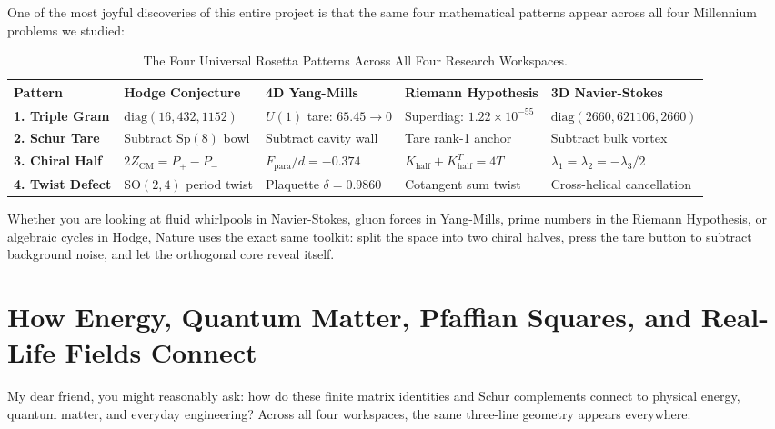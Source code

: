 \documentclass[11pt,a4paper]{article}
\theoremstyle{definition}
\begin{document}
One of the most joyful discoveries of this entire project is that the same four mathematical patterns appear across all four Millennium problems we studied:

\begin{table}[htbp]
\centering
\small
\begin{tabular}{lllll}
\toprule
\textbf{Pattern} & \textbf{Hodge Conjecture} & \textbf{4D Yang-Mills} & \textbf{Riemann Hypothesis} & \textbf{3D Navier-Stokes} \\
\midrule
\textbf{1. Triple Gram} & $\mathrm{diag}(16, 432, 1152)$ & $U(1)$ tare: $65.45 \to 0$ & Superdiag: $1.22 \times 10^{-55}$ & $\mathrm{diag}(2660, 621106, 2660)$ \\
\textbf{2. Schur Tare} & Subtract $\mathrm{Sp}(8)$ bowl & Subtract cavity wall & Tare rank-1 anchor & Subtract bulk vortex \\
\textbf{3. Chiral Half} & $2 Z_{\mathrm{CM}} = P_+ - P_-$ & $F_{\mathrm{para}} / d = -0.374$ & $K_{\mathrm{half}} + K_{\mathrm{half}}^T = 4 T$ & $\lambda_1 = \lambda_2 = -\lambda_3 / 2$ \\
\textbf{4. Twist Defect} & $\mathrm{SO}(2,4)$ period twist & Plaquette $\delta = 0.9860$ & Cotangent sum twist & Cross-helical cancellation \\
\bottomrule
\end{tabular}
\caption{The Four Universal Rosetta Patterns Across All Four Research Workspaces.}
\end{table}

Whether you are looking at fluid whirlpools in Navier-Stokes, gluon forces in Yang-Mills, prime numbers in the Riemann Hypothesis, or algebraic cycles in Hodge, Nature uses the exact same toolkit: split the space into two chiral halves, press the tare button to subtract background noise, and let the orthogonal core reveal itself.


\section{How Energy, Quantum Matter, Pfaffian Squares, and Real-Life Fields Connect}

My dear friend, you might reasonably ask: how do these finite matrix identities and Schur complements connect to physical energy, quantum matter, and everyday engineering? Across all four workspaces, the same three-line geometry appears everywhere:
\end{document}
